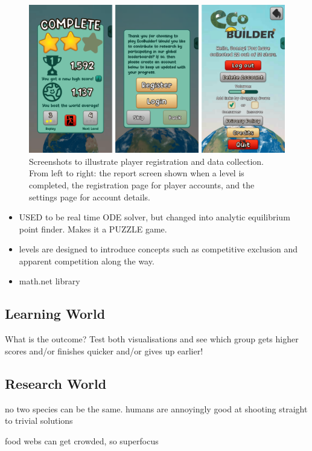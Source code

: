 \begin{figure}
    \centering
    \includegraphics[width=\textwidth]{joy/server.png}
    \caption[Player registration and data collection]{Screenshots to illustrate player registration and data collection. From left to right: the report screen shown when a level is completed, the registration page for player accounts, and the settings page for account details.}
    \label{fig:eco_server}
\end{figure}

\begin{itemize}
  \item USED to be real time ODE solver, but changed into analytic equilibrium point finder. Makes it a PUZZLE game.
  \item levels are designed to introduce concepts such as competitive exclusion and apparent competition along the way.
  \item math.net library
\end{itemize}

\subsection{Learning World}
\label{sec:learning_world}
What is the outcome? Test both visualisations and see which group gets higher scores and/or finishes quicker and/or gives up earlier!

\subsection{Research World}
\label{sec:research_world}
no two species can be the same.
humans are annoyingly good at shooting straight to trivial solutions

food webs can get crowded, so superfocus

